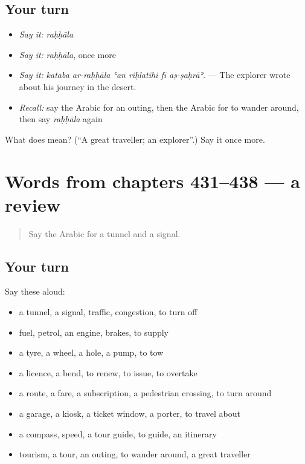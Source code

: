 \subsection*{Your turn}
\begin{itemize}
\raggedright
  \item \emph{Say it:} \emph{raḥḥāla}
  \item \emph{Say it:} \emph{raḥḥāla}, once more
  \item \emph{Say it:} \emph{kataba ar-raḥḥāla ʿan riḥlatihi fī aṣ-ṣaḥrāʾ.} — The explorer wrote about his journey in the desert.
  \item \emph{Recall:} say the Arabic for an outing, then the Arabic for to wander around, then say \emph{raḥḥāla} again
\end{itemize}

\begin{tcolorbox}[breakable,colback=teal!4,colframe=teal!35!black,title={Before you move on}]
What does  mean? (\textquotedblleft{}A great traveller; an explorer\textquotedblright{}.) Say it once more.
\end{tcolorbox}
\section[(dialogue)]{Words from chapters 431–438 — a review}

\label{lesson:AR-R438-review-431-438}



\begin{quote}
Say the Arabic for a tunnel and a signal.
\end{quote}

\subsection*{Your turn}
Say these aloud:

\begin{itemize}
\raggedright
  \item a tunnel, a signal, traffic, congestion, to turn off
  \item fuel, petrol, an engine, brakes, to supply
  \item a tyre, a wheel, a hole, a pump, to tow
  \item a licence, a bend, to renew, to issue, to overtake
  \item a route, a fare, a subscription, a pedestrian crossing, to turn around
  \item a garage, a kiosk, a ticket window, a porter, to travel about
  \item a compass, speed, a tour guide, to guide, an itinerary
  \item tourism, a tour, an outing, to wander around, a great traveller
\end{itemize}

